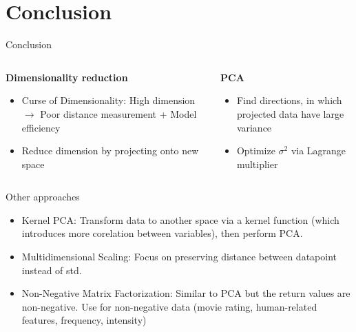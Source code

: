 \section{Conclusion}

\begin{frame}{Conclusion}
    \begin{columns}
        \begin{column}{0.5\textwidth}
            \begin{center}
                \textbf{Dimensionality reduction}
            \end{center}
            \begin{itemize}
                \item Curse of Dimensionality: High dimension $\to$ Poor distance measurement + Model efficiency
                \item Reduce dimension by projecting onto new space
            \end{itemize}
        \end{column}

        \begin{column}{0.5\textwidth}
            \begin{center}
                \textbf{PCA}
            \end{center}
            \begin{itemize}
                \item Find directions, in which projected data have large variance
                \item Optimize $\sigma^2$ via Lagrange multiplier
            \end{itemize}
        \end{column}
    \end{columns}
\end{frame}

\begin{frame}{Other approaches}
    \begin{itemize}
        \item Kernel PCA: Transform data to another space via a kernel function (which introduces more corelation between variables), then perform PCA.
        \item Multidimensional Scaling: Focus on preserving distance between datapoint instead of std.
        \item Non-Negative Matrix Factorization: Similar to PCA but the return values are non-negative. Use for non-negative data (movie rating, human-related features, frequency, intensity)
    \end{itemize}
\end{frame}
